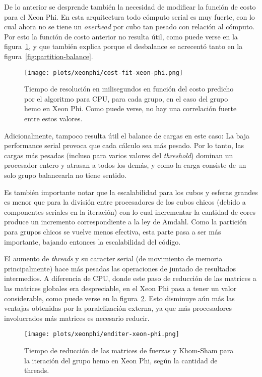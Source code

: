 De lo anterior se desprende tambi\'en la necesidad de modificar la funci\'on de costo
para el Xeon Phi. En esta arquitectura todo c\'omputo serial es muy fuerte, con
lo cual ahora no se tiene un \textit{overhead} por cubo tan pesado con relaci\'on
al c\'omputo. Por esto la funci\'on de costo anterior no resulta \'util, como
puede verse en la figura~\ref{fig:cost-function-xeon-phi}, y que tambi\'en explica
porque el desbalance se acrecent\'o tanto en la figura~\ref{fig:partition-balance}.

\begin{figure}[htbp]
   \centering
   \texttt{[image: plots/xeonphi/cost-fit-xeon-phi.png]}
   \caption{Tiempo de resoluci\'on en milisegundos en funci\'on del costo predicho
   por el algoritmo para CPU, para cada grupo, en el caso del grupo hemo en Xeon Phi.
   Como puede verse, no hay una correlaci\'on fuerte entre estos valores.}
   \label{fig:cost-function-xeon-phi}
\end{figure}

Adicionalmente, tampoco resulta \'util el balance de cargas en este caso: La baja
performance serial provoca que cada c\'alculo sea m\'as pesado. Por lo tanto, las
cargas m\'as pesadas (incluso para varios valores del \textit{threshold}) dominan
un procesador entero y atrasan a todos los dem\'as, y como la carga consiste de
un solo grupo balancearla no tiene sentido.

Es tambi\'en importante notar que la escalabilidad para los cubos
y esferas grandes es menor que para la divisi\'on entre procesadores de los cubos
chicos (debido a componentes seriales
en la iteraci\'on) con lo cual incrementar la cantidad de cores produce un
incremento correspondiente a la ley de Amdahl. Como la partici\'on para grupos
chicos se vuelve menos efectiva, esta parte pasa a ser m\'as importante, bajando
entonces la escalabilidad del c\'odigo.

El aumento de \textit{threads} y su caracter serial (de movimiento de memoria
principalmente) hace m\'as pesadas las operaciones de juntado de resultados intermedios.
A diferencia de CPU, donde este paso de reducci\'on de las matrices a las matrices
globales era despreciable, en el Xeon Phi pasa a tener un valor considerable, como
puede verse en la figura~\ref{fig:enditer-xeon-phi}. Esto disminuye a\'un m\'as
las ventajas obtenidas por la paralelizaci\'on externa, ya que m\'as procesadores
involucrados m\'as matrices es necesario reducir.

\begin{figure}[htbp]
   \centering
   \texttt{[image: plots/xeonphi/enditer-xeon-phi.png]}
   \caption{Tiempo de reducci\'on de las matrices de fuerzas y Khom-Sham para
   la iteraci\'on del grupo hemo en Xeon Phi, seg\'un la cantidad de threads.}
   \label{fig:enditer-xeon-phi}
\end{figure}

